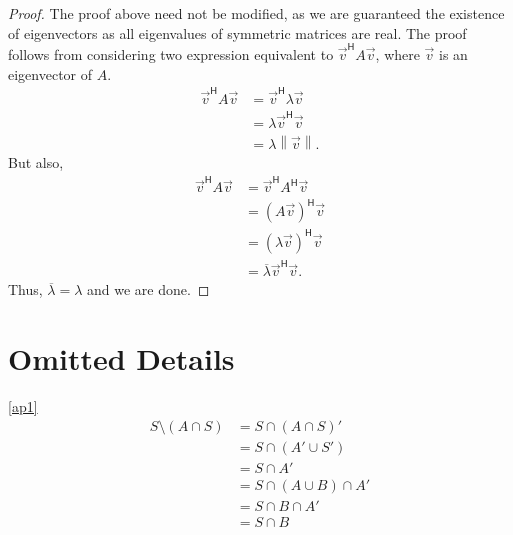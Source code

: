 \documentclass{article}
\theoremstyle{definition}
\begin{document}
\begin{proof}
	The proof above need not be modified, as we are guaranteed the existence of eigenvectors as all eigenvalues of symmetric matrices are real. The proof follows from considering two expression equivalent to $\vec v^\mathsf{H}A\vec v$, where $\vec v$ is an eigenvector of $A$.
	\begin{align*}
		\vec v^\mathsf{H}A\vec v&=\vec v^\mathsf{H}\lambda\vec v\\
		&=\lambda\vec v^\mathsf{H}\vec v\\
		&=\lambda\left\lVert\vec v\right\rVert.
	\end{align*}
	But also,
	\begin{align*}
		\vec v^\mathsf{H}A\vec v&=\vec v^\mathsf{H}A^\mathsf{H}\vec v\\
		&=(A\vec v)^\mathsf{H}\vec v\\
		&=(\lambda\vec v)^\mathsf{H}\vec v\\
		&=\overline{\lambda}\vec v^\mathsf{H}\vec v.
	\end{align*}
	Thus, $\overline{\lambda}=\lambda$ and we are done.
\end{proof}

\newpage
\section{Omitted Details}
\ref{ap1}
\begin{align}\label{eq:1}
	S\setminus (A\cap S)&=S\cap(A\cap S)'\\\nonumber
	&=S\cap(A'\cup S')\\\nonumber
	&=S\cap A'\\\nonumber
	&=S\cap (A\cup B)\cap A'\\\nonumber
	&=S\cap B\cap A'\\\nonumber
	&=S\cap B\tag*{$(B\subseteq A')$}\nonumber
\end{align}

\newpage

\end{document}

